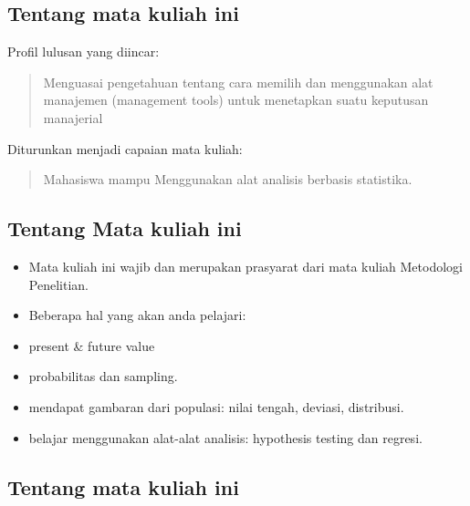 \documentclass[
  letterpaper,
  DIV=11,
  numbers=noendperiod]{scrartcl}
\begin{document}
\subsection{Tentang mata kuliah ini}\label{tentang-mata-kuliah-ini}

Profil lulusan yang diincar:

\begin{quote}
Menguasai pengetahuan tentang cara memilih dan menggunakan alat
manajemen (management tools) untuk menetapkan suatu keputusan manajerial
\end{quote}

Diturunkan menjadi capaian mata kuliah:

\begin{quote}
Mahasiswa mampu Menggunakan alat analisis berbasis statistika.
\end{quote}

\subsection{Tentang Mata kuliah ini}\label{tentang-mata-kuliah-ini-1}

\begin{itemize}
\item
  Mata kuliah ini wajib dan merupakan prasyarat dari mata kuliah
  Metodologi Penelitian.
\item
  Beberapa hal yang akan anda pelajari:
\item
  present \& future value
\item
  probabilitas dan sampling.
\item
  mendapat gambaran dari populasi: nilai tengah, deviasi, distribusi.
\item
  belajar menggunakan alat-alat analisis: hypothesis testing dan
  regresi.
\end{itemize}

\subsection{Tentang mata kuliah ini}\label{tentang-mata-kuliah-ini-2}
\end{document}
